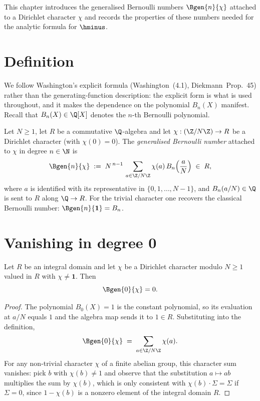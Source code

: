 
This chapter introduces the generalised Bernoulli numbers
$\Bgen{n}{\chi}$ attached to a Dirichlet character $\chi$ and records
the properties of these numbers needed for the analytic formula for
$\hminus$.

\section{Definition}

We follow Washington's explicit formula
(Washington~(4.1), Diekmann~Prop.~45) rather than the
generating-function description: the explicit form is what is used
throughout, and it makes the dependence on the polynomial $B_n(X)$
manifest. Recall that $B_n(X) \in \Q[X]$ denotes the $n$-th Bernoulli
polynomial.

\begin{definition}
  \label{def:gen-bernoulli}
  \leanok
Let $N \ge 1$, let $R$ be a commutative $\Q$-algebra and let
$\chi : (\Z/N\Z) \to R$ be a Dirichlet character (with $\chi(0) = 0$).
The \emph{generalised Bernoulli number} attached to $\chi$ in degree
$n \in \N$ is
\[
  \Bgen{n}{\chi}
  \;:=\;
  N^{\,n-1}\,\sum_{a \in \Z/N\Z} \chi(a)\,B_n\!\left(\frac{a}{N}\right)
  \;\in\; R,
\]
where $a$ is identified with its representative in
$\{0,1,\dots,N-1\}$, and $B_n(a/N) \in \Q$ is
sent to $R$ along $\Q \to R$. For the trivial character one recovers
the classical Bernoulli number: $\Bgen{n}{\mathbf{1}} = B_n$.
\end{definition}

\section{Vanishing in degree 0}

\begin{proposition}[$\Bgen{0}{\chi} = 0$ for non-trivial $\chi$]
  \label{prop:gen-bernoulli-zero}
  \leanok
Let $R$ be an integral domain and let $\chi$ be a Dirichlet character
modulo $N \ge 1$ valued in $R$ with $\chi \ne \mathbf{1}$. Then
\[
  \Bgen{0}{\chi} = 0.
\]
\end{proposition}

\begin{proof}\leanok
The polynomial $B_0(X) = 1$ is the constant polynomial, so its
evaluation at $a/N$ equals $1$ and the algebra map sends it to
$1 \in R$. Substituting into the definition,
\[
  \Bgen{0}{\chi} \;=\; \sum_{a \in \Z/N\Z} \chi(a).
\]
For any non-trivial character $\chi$ of a finite abelian group, this
character sum vanishes: pick $b$ with $\chi(b) \ne 1$ and observe that
the substitution $a \mapsto a b$ multiplies the sum by $\chi(b)$, which
is only consistent with $\chi(b) \cdot \Sigma = \Sigma$ if $\Sigma = 0$,
since $1 - \chi(b)$ is a nonzero element of the integral domain $R$.
\end{proof}

